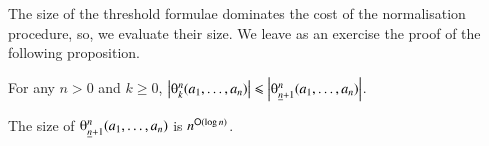 %
%
%

The size of the threshold formulae dominates the cost of the normalisation procedure, so, we evaluate their size. We leave as an exercise the proof of the following proposition.

\begin{proposition}\label{proposition:LargestThresholdFormula}
For any $n>0$ and $k\ge0$, $\size{\th kn\avec1n}\le\size{\th{\underline  n+1}n\avec1n}$.
\end{proposition}

\begin{lemma}\label{lemma:SizeThresholdMax}
The size of\/ $\th{\underline  n+1}n\avec1n$ is $n^{{\mathsf O}(\log n)}$.
\end{lemma}


